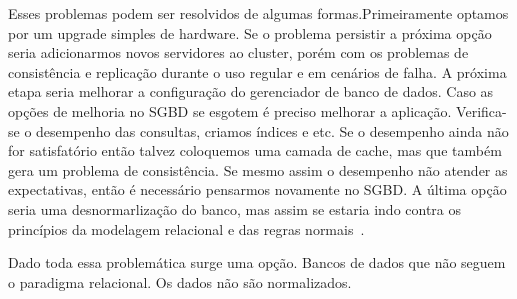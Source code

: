 Esses problemas podem ser resolvidos de algumas formas.Primeiramente optamos por um upgrade simples de hardware. Se o problema persistir a próxima opção seria adicionarmos novos servidores ao cluster, porém com os problemas de consistência e replicação durante o uso regular e em cenários de falha. A próxima etapa seria melhorar a configuração do gerenciador de banco de dados. Caso as opções de melhoria no SGBD se esgotem é preciso melhorar a aplicação. Verifica-se o desempenho das consultas, criamos índices e etc. Se o desempenho ainda não for satisfatório então talvez coloquemos uma camada de cache, mas que também gera um problema de consistência. Se mesmo assim o desempenho não atender as expectativas, então é necessário pensarmos novamente no SGBD. A última opção seria uma desnormarlização do banco, mas assim se estaria indo contra os princípios da modelagem relacional e das regras normais~\cite{cassandraguide}.

Dado toda essa problemática surge uma opção. Bancos de dados que não seguem o paradigma relacional. Os dados não são normalizados.





